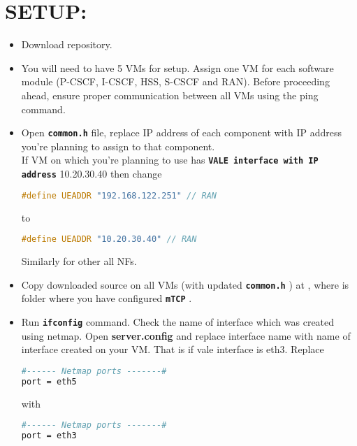 \documentclass[hidelinks]{report}
\newcommand{\cf}[1] {
	\textbf{\texttt{#1}}
}
\begin{document}
\section*{SETUP:}
\begin{itemize}
\item Download repository.  
\item You will need to have 5 VMs for setup. Assign one VM for each software module (P-CSCF, I-CSCF, HSS, S-CSCF and RAN). Before proceeding ahead, ensure proper communication between all VMs using the ping command. 
\item Open \cf{common.h} file, replace IP address of each component with IP address you're planning to assign to that component. \\
If VM on which you're planning to use has \cf{VALE interface with IP address} 10.20.30.40 then change \ 
\begin{lstlisting}[language=c]
#define UEADDR "192.168.122.251" // RAN 
\end{lstlisting}
to 

\begin{lstlisting}[language=c]
#define UEADDR "10.20.30.40" // RAN \end{lstlisting}

Similarly for other all NFs. 

\item Copy downloaded source on all VMs (with updated \cf{common.h}) at , where  is folder where you have configured \cf{mTCP}.
\item  Run \cf{ifconfig} command. Check the name of interface which was created using netmap. Open \textbf{server.config} and replace interface name with name of interface created on your VM.  That is if vale interface is eth3.
Replace
\begin{lstlisting}[language=bash]
#------ Netmap ports -------#
port = eth5
\end{lstlisting}
with
\begin{lstlisting}[language=bash]
#------ Netmap ports -------#
port = eth3
\end{lstlisting}



\end{itemize}
\end{document}
